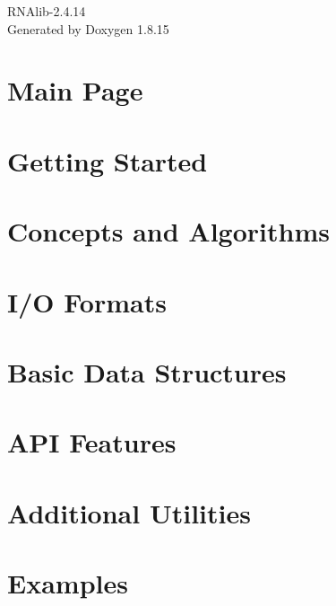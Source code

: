 \let\mypdfximage\pdfximage\def\pdfximage{\immediate\mypdfximage}\documentclass[twoside]{book}
\newcommand{\+}{\discretionary{\mbox{\scriptsize$\hookleftarrow$}}{}{}}
\newcommand{\clearemptydoublepage}{%
  \newpage{\pagestyle{empty}\cleardoublepage}%
}
\begin{document}
\hypersetup{pageanchor=false,
             bookmarksnumbered=true,
             pdfencoding=unicode
            }
\begin{titlepage}
\vspace*{7cm}
\begin{center}%
{\Large R\+N\+Alib-\/2.4.14 }\\
\vspace*{1cm}
{\large Generated by Doxygen 1.8.15}\\
\end{center}
\end{titlepage}
\clearemptydoublepage
{}
\tableofcontents
\clearemptydoublepage
{}
\hypersetup{pageanchor=true}

\chapter{Main Page}
\label{index}\hypertarget{index}{}
\chapter{Getting Started}
\label{getting_started}

\chapter{Concepts and Algorithms}
\label{concepts}

\chapter{I/O Formats}
\label{io}

\chapter{Basic Data Structures}
\label{data_structures}

\chapter{A\+PI Features}
\label{api_features}

\chapter{Additional Utilities}
\label{utilities}

\chapter{Examples}
\label{examples}

\end{document}
